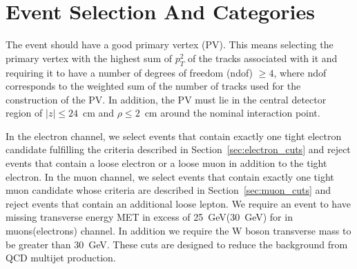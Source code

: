 \section{Event Selection And Categories}
\label{sec:evtSelCat}
The event should have a good primary vertex (PV). This means selecting
the primary vertex with the highest sum of $p_{T}^2$ of the tracks
associated with it and requiring it to have a number of degrees of
freedom (ndof) $\ge 4$, where ndof corresponds to the weighted sum of
the number of tracks used for the construction of the PV. In addition,
the PV must lie in the central detector region of $|z| \le 24$~cm
and $\rho \le 2$~cm around the nominal interaction point.


\par
In the electron channel, we select events that contain exactly one
tight electron candidate fulfilling the criteria described in
Section~\ref{sec:electron_cuts} and reject events that contain a
loose electron or a loose muon in addition to the tight electron. 
In the muon channel, we select events that contain exactly one
tight muon candidate whose criteria are described in
Section~\ref{sec:muon_cuts} and reject events that contain an
additional loose lepton.
We require an event to have missing transverse energy
MET in excess of 25~GeV(30~GeV) for in muons(electrons) channel.
In addition we require the W boson transverse mass to be greater than 30~GeV.  These cuts are designed to reduce the background
from QCD multijet production.


